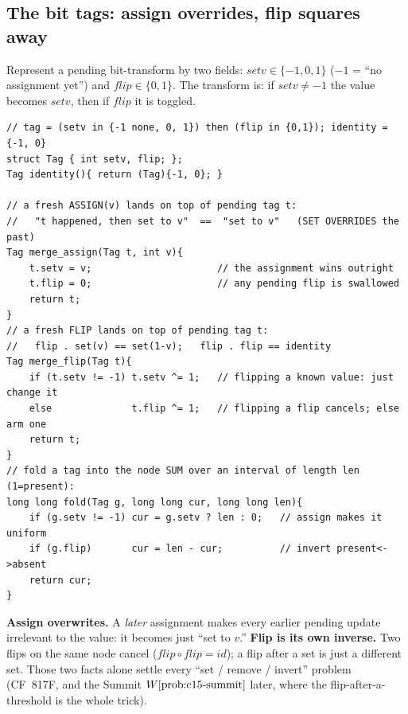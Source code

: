 \subsection{The bit tags: assign overrides, flip squares away}

Represent a pending bit-transform by two fields: \(\mathit{setv}\in\{-1,0,1\}\) (\(-1\) = ``no assignment yet'') and \(\mathit{flip}\in\{0,1\}\).  The transform is: if \(\mathit{setv}\neq-1\) the value becomes \(\mathit{setv}\), then if \(\mathit{flip}\) it is toggled.

\begin{lstlisting}[caption={compose a new update into an existing assign/flip tag (order: old first, then the new op)}, label={lst:c15-compose}]
// tag = (setv in {-1 none, 0, 1}) then (flip in {0,1}); identity = {-1, 0}
struct Tag { int setv, flip; };
Tag identity(){ return (Tag){-1, 0}; }

// a fresh ASSIGN(v) lands on top of pending tag t:
//   "t happened, then set to v"  ==  "set to v"   (SET OVERRIDES the past)
Tag merge_assign(Tag t, int v){
    t.setv = v;                      // the assignment wins outright
    t.flip = 0;                      // any pending flip is swallowed
    return t;
}
// a fresh FLIP lands on top of pending tag t:
//   flip . set(v) == set(1-v);   flip . flip == identity
Tag merge_flip(Tag t){
    if (t.setv != -1) t.setv ^= 1;   // flipping a known value: just change it
    else              t.flip ^= 1;   // flipping a flip cancels; else arm one
    return t;
}
// fold a tag into the node SUM over an interval of length len (1=present):
long long fold(Tag g, long long cur, long long len){
    if (g.setv != -1) cur = g.setv ? len : 0;   // assign makes it uniform
    if (g.flip)       cur = len - cur;          // invert present<->absent
    return cur;
}
\end{lstlisting}

\begin{insightbox}
\textbf{Assign overwrites.}  A \emph{later} assignment makes every earlier pending update irrelevant to the value: it becomes just ``set to \(v\).''  \textbf{Flip is its own inverse.}  Two flips on the same node cancel (\(\mathit{flip}\circ\mathit{flip}=\mathit{id}\)); a flip after a set is just a different set.  Those two facts alone settle every ``set / remove / invert'' problem (CF~817F, and the Summit \(\probref{c15-summit}\) later, where the flip-after-a-threshold is the whole trick).
\end{insightbox}

